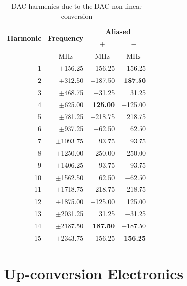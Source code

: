 \documentclass[12pt,letterpaper]{article}
\begin{document}
\begin{table}[htbp]
  \renewcommand{\multirowsetup}{\centering}
  \centering
  \caption{DAC harmonics due to the DAC non linear conversion}
  \label{tab:harmonics}
  \vspace{0.5em}
  \begin{tabular}{|r|r|r|r|}
    \hline
    \multirow{2}{*}{\textbf{Harmonic}} & \multirow{2}{*}{\textbf{Frequency}} & \multicolumn{2}{c|}{\textbf{Aliased}} \\
    \cline{3-4}
    & & \multicolumn{1}{c|}{$\mathbf{+}$} & \multicolumn{1}{c|}{$\mathbf{-}$} \\
    \hline
    & \multicolumn{1}{|c|}{MHz} & \multicolumn{1}{c|}{MHz} & \multicolumn{1}{c|}{MHz} \\
    \hline \hline
    1 & $\pm$156.25 & 156.25 & $-$156.25 \\
    \hline
    2 & $\pm$312.50 & $-$187.50 & \textbf{187.50} \\
    \hline
    3 & $\pm$468.75 & $-$31.25 & 31.25 \\
    \hline
    4 & $\pm$625.00 & \textbf{125.00} & $-$125.00 \\
    \hline
    5 & $\pm$781.25 & $-$218.75 & 218.75 \\
    \hline
    6 & $\pm$937.25 & $-$62.50 & 62.50 \\
    \hline
    7 & $\pm$1093.75 & 93.75 & $-$93.75 \\
    \hline
    8 & $\pm$1250.00 & 250.00 & $-$250.00 \\
    \hline
    9 & $\pm$1406.25 & $-$93.75 & 93.75 \\
    \hline
    10 & $\pm$1562.50 & 62.50 & $-$62.50 \\
    \hline
    11 & $\pm$1718.75 & 218.75 & $-$218.75 \\
    \hline
    12 & $\pm$1875.00 & $-$125.00 & 125.00 \\
    \hline
    13 & $\pm$2031.25 & 31.25 & $-$31.25 \\
    \hline
    14 & $\pm$2187.50 & \textbf{187.50} & $-$187.50 \\
    \hline
    15 & $\pm$2343.75 & $-$156.25 & \textbf{156.25} \\
    \hline
  \end{tabular}
\end{table}

\section{Up-conversion Electronics}
\label{sec:upconversion}
\end{document}
